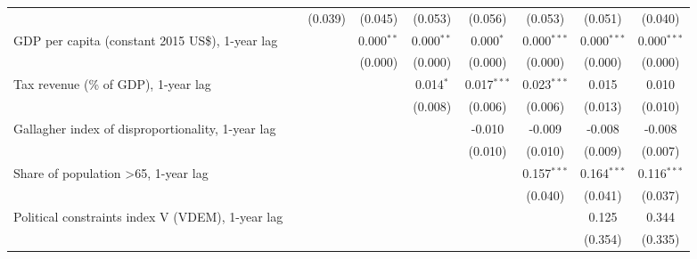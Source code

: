 \begin{table}[htbp]
\begin{tabular}{lcccccccc}
                                                                                       &                & (0.039)        & (0.045)        & (0.053)       & (0.056)       & (0.053)       & (0.051)       & (0.040)\\   
      GDP per capita (constant 2015 US\$), 1-year lag                                  &                &                & 0.000$^{**}$   & 0.000$^{**}$  & 0.000$^{*}$   & 0.000$^{***}$ & 0.000$^{***}$ & 0.000$^{***}$\\   
                                                                                       &                &                & (0.000)        & (0.000)       & (0.000)       & (0.000)       & (0.000)       & (0.000)\\   
      Tax revenue (\% of GDP), 1-year lag                                              &                &                &                & 0.014$^{*}$   & 0.017$^{***}$ & 0.023$^{***}$ & 0.015         & 0.010\\   
                                                                                       &                &                &                & (0.008)       & (0.006)       & (0.006)       & (0.013)       & (0.010)\\   
      Gallagher index of disproportionality, 1-year lag                                &                &                &                &               & -0.010        & -0.009        & -0.008        & -0.008\\   
                                                                                       &                &                &                &               & (0.010)       & (0.010)       & (0.009)       & (0.007)\\   
      Share of population >65, 1-year lag                                              &                &                &                &               &               & 0.157$^{***}$ & 0.164$^{***}$ & 0.116$^{***}$\\   
                                                                                       &                &                &                &               &               & (0.040)       & (0.041)       & (0.037)\\   
      Political constraints index V (VDEM), 1-year lag                                 &                &                &                &               &               &               & 0.125         & 0.344\\   
                                                                                       &                &                &                &               &               &               & (0.354)       & (0.335)\\   

\end{tabular}
\end{table}
